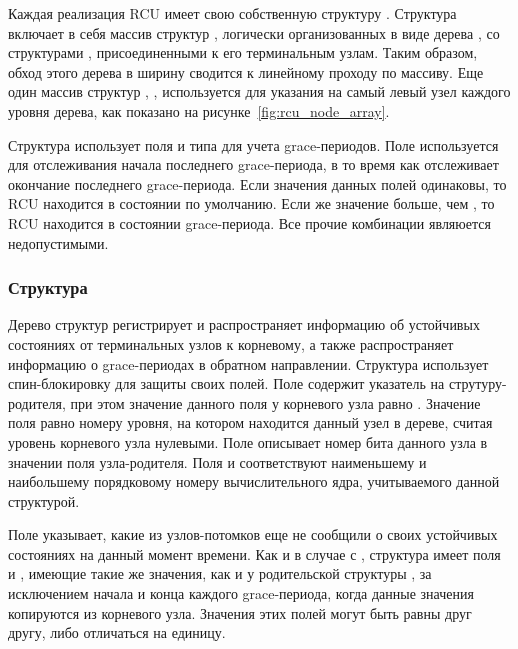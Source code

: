 Каждая реализация RCU имеет свою собственную структуру .
Структура  включает в себя массив структур ,
логически организованных в виде дерева ,
со структурами , присоединенными к его терминальным узлам.
Таким образом, обход этого дерева в ширину сводится к линейному проходу по массиву.
Еще один массив структур , ,
используется для указания на самый левый узел каждого уровня дерева,
как показано на рисунке~\ref{fig:rcu_node_array}.

Структура  использует поля  и 
типа  для учета grace-периодов.
Поле  используется для отслеживания начала последнего grace-периода,
в то время как  отслеживает окончание последнего grace-периода.
Если значения данных полей одинаковы, то RCU находится в состоянии по умолчанию.
Если же значение  больше, чем , то RCU находится в состоянии
grace-периода. Все прочие комбинации являюется недопустимыми.

\subsubsection{Структура }
\label{sec:rcu_node}
Дерево структур  регистрирует и распространяет
информацию об устойчивых состояниях от терминальных узлов к корневому,
а также распространяет информацию о grace-периодах в обратном направлении.
Структура  использует спин-блокировку  для защиты
своих полей. Поле  содержит указатель на струтуру-родителя,
при этом значение данного поля у корневого узла равно .
Значение поля  равно номеру уровня,
на котором находится данный узел в дереве,
считая уровень корневого узла нулевыми.
Поле  описывает номер бита данного узла в значении поля
 узла-родителя.
Поля  и  соответствуют наименьшему и наибольшему
порядковому номеру вычислительного ядра, учитываемого данной структурой.

Поле  указывает, какие из узлов-потомков еще не сообщили
о своих устойчивых состояниях на данный момент времени.
Как и в случае с , структура  имеет поля
 и , имеющие такие же значения, как и у родительской
структуры , за исключением начала и конца каждого
grace-периода, когда данные значения копируются из корневого узла.
Значения этих полей могут быть равны друг другу, либо отличаться на единицу.

